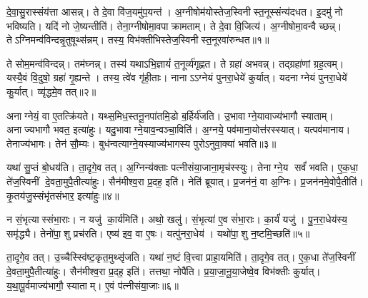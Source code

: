 

\clearpage
{}
\setcounter{anuvakam}{0}
दे॒वा॒सु॒रास्संय॑त्ता आसन्न्। ते दे॒वा वि॑ज॒यमु॑प॒यन्त॑। अ॒ग्नीषोम॑योस्तेज॒स्विनीस्त॒नूस्संन्य॑दधत। इ॒दमु॑ नो भविष्यति। यदि॑ नो जे॒ष्यन्तीति॑। तेना॒ग्नीषोमा॒वपाक्रामताम्। ते दे॒वा वि॒जित्य॑। अ॒ग्नीषोमा॒वन्वैच्छन्न्। तेऽग्निमन्व॑विन्दन्नृ॒तुषूथ्स॑न्नम्। तस्य॒ विभ॑क्तीभिस्तेज॒स्विनीस्त॒नूरवा॑रुन्धत॥१॥

ते सोम॒मन्व॑विन्दन्न्। तम॑घ्नन्न्। तस्य॑ यथाऽभि॒ज्ञायं॑ त॒नूर्व्य॑गृह्णत। ते ग्रहा॑ अभवन्न्। तद्ग्रहा॑णां ग्रह॒त्वम्। यस्यै॒वं वि॒दुषो॒ ग्रहा॑ गृ॒ह्यन्ते। तस्य॒ त्वे॑व गृ॑ही॒ताः। नानाऽऽग्नेयं पुनरा॒धेये॑ कुर्यात्। यदनाग्नेयं पुनरा॒धेये॑ कु॒र्यात्। व्यृ॑द्धमे॒व तत्॥२॥

अनाग्नेयं॒ वा ए॒तत्क्रि॑यते। यथ्स॒मिध॒स्तनू॒नपा॑तमि॒डो ब॒र्\mbox{}हिर्य॑जति। उ॒भावाग्ने॒यावाज्य॑भागौ स्याताम्। अनाज्यभागौ भवत॒ इत्या॑हुः। यदु॒भावाग्ने॒याव॒न्वञ्चा॒विति॑। अ॒ग्नये॒ पव॑माना॒योत्त॑रस्स्यात्। यत्पव॑मानाय। तेनाज्य॑भागः। तेन॑ सौ॒म्यः। बुध॑न्वत्याग्ने॒यस्याज्य॑भागस्य पुरोऽनुवा॒क्या॑ भवति॥३॥

यथा॑ सु॒प्तं बो॒धय॑ति। ता॒दृगे॒व तत्। अ॒ग्निन्य॑क्ताः पत्नीसंया॒जाना॒मृच॑स्स्युः। तेनाग्ने॒य सर्वं॑ भवति। ए॒क॒धा॒ ते॑ज॒स्विनीं दे॒वता॒मुपै॒तीत्या॑हुः। सैन॑मीश्व॒रा प्र॒दह॒ इति॑। नेति॑ ब्रूयात्। प्र॒जन॑नं॒ वा अ॒ग्निः। प्र॒जन॑नमे॒वोपै॒तीति॑। कृ॒तय॑जु॒स्संभृ॑तसंभार॒ इत्या॑हुः॥४॥

न सं॒भृत्यास्संभा॒राः। न यजु॑ का॒र्य॑मिति॑। अथो॒ खलु॑। सं॒भृत्या॑ ए॒व सं॑भा॒राः। का॒र्यं॑ यजु॑। पु॒न॒रा॒धेय॑स्य॒ समृ॑द्ध्यै। तेनो॑पा॒शु प्रच॑रति। एष्य॑ इव॒ वा ए॒षः। यत्पु॑नरा॒धेय॑। यथो॑पा॒शु न॒ष्टमि॒च्छति॑॥५॥

ता॒दृगे॒व तत्। उ॒च्चैस्स्वि॑ष्ट॒कृत॒मुथ्सृ॑जति। यथा॑ न॒ष्टं वि॒त्त्वा प्राहा॒यमिति॑। ता॒दृगे॒व तत्। ए॒क॒धा ते॑ज॒स्विनीं दे॒वता॒मुपै॒तीत्या॑हुः। सैन॑मीश्व॒रा प्र॒दह॒ इति॑। तत्तथा॒ नोपै॑ति। प्र॒या॒जा॒नू॒या॒जेष्वे॒व विभ॑क्तीः कुर्यात्। य॒था॒पू॒र्वमाज्य॑भागौ॒ स्याताम्। ए॒वं प॑त्नीसंया॒जाः॥६॥

